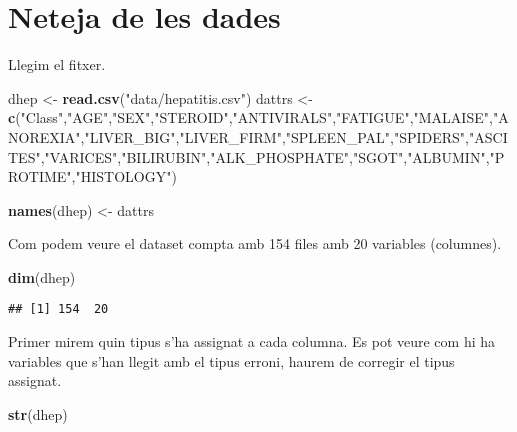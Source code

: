 \documentclass[]{article}
\newenvironment{Shaded}{\begin{snugshade}}{\end{snugshade}}
\newcommand{\KeywordTok}[1]{\textcolor[rgb]{0.13,0.29,0.53}{\textbf{#1}}}
\newcommand{\NormalTok}[1]{#1}
\newcommand{\StringTok}[1]{\textcolor[rgb]{0.31,0.60,0.02}{#1}}
\begin{document}
\hypertarget{neteja-de-les-dades}{%
\section{Neteja de les dades}\label{neteja-de-les-dades}}

Llegim el fitxer.

\begin{Shaded}
\begin{Highlighting}[]
\NormalTok{dhep <-}\StringTok{ }\KeywordTok{read.csv}\NormalTok{(}\StringTok{"data/hepatitis.csv"}\NormalTok{)}
\NormalTok{dattrs <-}\StringTok{ }\KeywordTok{c}\NormalTok{(}\StringTok{"Class"}\NormalTok{,}\StringTok{"AGE"}\NormalTok{,}\StringTok{"SEX"}\NormalTok{,}\StringTok{"STEROID"}\NormalTok{,}\StringTok{"ANTIVIRALS"}\NormalTok{,}\StringTok{"FATIGUE"}\NormalTok{,}\StringTok{"MALAISE"}\NormalTok{,}\StringTok{"ANOREXIA"}\NormalTok{,}\StringTok{"LIVER_BIG"}\NormalTok{,}\StringTok{"LIVER_FIRM"}\NormalTok{,}\StringTok{"SPLEEN_PAL"}\NormalTok{,}\StringTok{"SPIDERS"}\NormalTok{,}\StringTok{"ASCITES"}\NormalTok{,}\StringTok{"VARICES"}\NormalTok{,}\StringTok{"BILIRUBIN"}\NormalTok{,}\StringTok{"ALK_PHOSPHATE"}\NormalTok{,}\StringTok{"SGOT"}\NormalTok{,}\StringTok{"ALBUMIN"}\NormalTok{,}\StringTok{"PROTIME"}\NormalTok{,}\StringTok{"HISTOLOGY"}\NormalTok{)}

\KeywordTok{names}\NormalTok{(dhep) <-}\StringTok{ }\NormalTok{dattrs}
\end{Highlighting}
\end{Shaded}

Com podem veure el dataset compta amb 154 files amb 20 variables
(columnes).

\begin{Shaded}
\begin{Highlighting}[]
\KeywordTok{dim}\NormalTok{(dhep)}
\end{Highlighting}
\end{Shaded}

\begin{verbatim}
## [1] 154  20
\end{verbatim}

Primer mirem quin tipus s'ha assignat a cada columna. Es pot veure com
hi ha variables que s'han llegit amb el tipus erroni, haurem de corregir
el tipus assignat.

\begin{Shaded}
\begin{Highlighting}[]
\KeywordTok{str}\NormalTok{(dhep)}
\end{Highlighting}
\end{Shaded}
\end{document}
